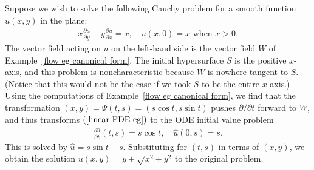 \begin{example}
Suppose we wish to solve the following Cauchy problem for a smooth function $u(x,y)$ in the plane:
\begin{align}\label{linear PDE eg}
x\frac{\partial u}{\partial y}-y\frac{\partial u}{\partial x}=x,\quad u(x,0)=x\text{ when }x>0.
\end{align}
The vector field acting on $u$ on the left-hand side is the vector field $W$ of Example~\ref{flow eg canonical form}. The initial hypersurface $S$ is the positive $x$-axis, and this problem is noncharacteristic because $W$ is nowhere tangent to $S$. (Notice that this would not be the case if we took $S$ to be the entire $x$-axis.) Using the computations of Example~\ref{flow eg canonical form}, we find that the transformation $(x,y)=\varPsi(t,s)=(s\cos t,s\sin t)$ pushes $\partial/\partial t$ forward to $W$, and thus transforms $(\ref{linear PDE eg})$ to the ODE initial value problem
\begin{align*}
\frac{\partial\widehat{u}}{\partial t}(t,s)=s\cos t,\quad\widehat{u}(0,s)=s.
\end{align*}
This is solved by $\widehat{u}=s\sin t+s$. Substituting for $(t,s)$ in terms of $(x,y)$, we obtain the solution $u(x,y)=y+\sqrt{x^2+y^2}$ to the original problem.
\end{example}
